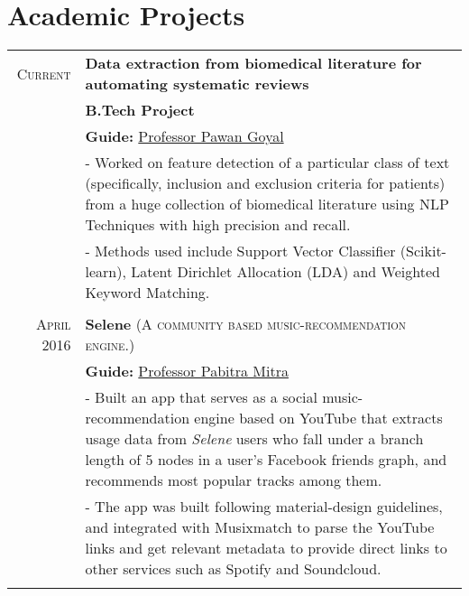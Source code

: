 \documentclass[a4paper,10pt]{extarticle} %
\begin{document}

\section{Academic Projects}

\begin{tabular}{r|p{16cm}}

\textsc{Current} & \textbf{Data extraction from biomedical literature for automating systematic reviews} \\
& \textbf{B.Tech Project}\\
& \textbf{Guide: }\textmd{\href{http://cse.iitkgp.ac.in/~pawang/}{Professor Pawan Goyal}}\\
& \footnotesize{- Worked on feature detection of a particular class of text (specifically, inclusion and exclusion criteria for patients) from a huge collection of biomedical literature using NLP Techniques with high precision and recall.}\\
& \footnotesize{- Methods used include Support Vector Classifier (Scikit-learn), Latent Dirichlet Allocation (LDA) and Weighted Keyword Matching.}\\
\multicolumn{2}{c}{} \\

\textsc{April 2016} & \textbf{Selene} \textsc{(A community based music-recommendation engine.)} \\
& \textbf{Guide: }\textmd{\href{http://cse.iitkgp.ac.in/~pabitra/}{Professor Pabitra Mitra}}\\
& \footnotesize{- Built an app that serves as a social music-recommendation engine based on YouTube that extracts usage data from {\itshape{Selene}} users who fall under a branch length of 5 nodes in a user's Facebook friends graph, and recommends most popular tracks among them.}\\
& \footnotesize{- The app was built following material-design guidelines, and integrated with Musixmatch to parse the YouTube links and get relevant metadata to provide direct links to other services such as Spotify and Soundcloud.}\\
\multicolumn{2}{c}{} \\

\end{tabular}
\end{document}
